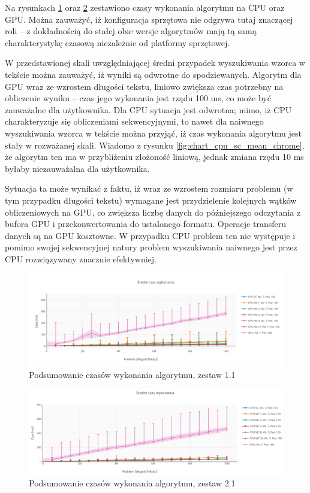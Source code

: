 Na rysunkach \ref{fig:chart_summary_chrome_damian} oraz \ref{fig:chart_summary_chrome_maja} zestawiono czasy wykonania algorytmu na CPU oraz GPU. Można zauważyć, iż konfiguracja sprzętowa nie odgrywa tutaj znaczącej roli -- z dokładnością do stałej obie wersje algorytmów mają tą samą charakterystykę czasową niezależnie od platformy sprzętowej.

W przedstawionej skali uwzględniającej średni przypadek wyszukiwania wzorca w tekście można zauważyć, iż wyniki są odwrotne do spodziewanych. Algorytm dla GPU wraz ze wzrostem długości tekstu, liniowo zwiększa czas potrzebny na obliczenie wyniku -- czas jego wykonania jest rządu 100 ms, co może być zauważalne dla użytkownika. Dla CPU sytuacja jest odwrotna; mimo, iż CPU charakteryzuje się obliczeniami sekwencyjnymi, to nawet dla naiwnego wyszukiwania wzorca w tekście można przyjąć, iż czas wykonania algorytmu jest stały w rozważanej skali. Wiadomo z rysunku \ref{fig:chart_cpu_sc_mean_chrome}, że algorytm ten ma w przybliżeniu złożoność liniową, jednak zmiana rzędu 10 ms byłaby niezauważalna dla użytkownika.

Sytuacja ta może wynikać z faktu, iż wraz ze wzrostem rozmiaru problemu (w tym przypadku długości tekstu) wymagane jest przydzielenie kolejnych wątków obliczeniowych na GPU, co zwiększa liczbę danych do późniejszego odczytania z bufora GPU i przekonwertowania do ustalonego formatu. Operacje transferu danych są na GPU kosztowne. W przypadku CPU problem ten nie występuje i pomimo swojej sekwencyjnej natury problem wyszukiwania naiwnego jest przez CPU rozwiązywany znacznie efektywniej.

\begin{figure}
    \centering
    \includegraphics[keepaspectratio, width=1.0\linewidth, trim=1.1cm 0.9cm 0.5cm 3.5cm, clip]{benchmarks/nvidia970_chrome/summary_mean.png}
    \caption{Podsumowanie czasów wykonania algorytmu, zestaw 1.1}
    \label{fig:chart_summary_chrome_damian}
\end{figure}

\begin{figure}
    \centering
    \includegraphics[keepaspectratio, width=1.0\linewidth, trim= 0 0 0 2.7cm, clip]{benchmarks/intel_hd520_chrome/summary_mean.png}
    \caption{Podsumowanie czasów wykonania algorytmu, zestaw 2.1}
    \label{fig:chart_summary_chrome_maja}
\end{figure}